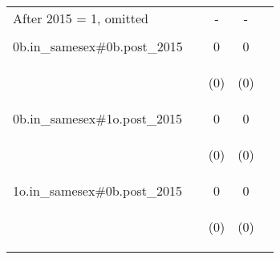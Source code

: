 \documentclass[]{article}
\begin{document}
\begin{center}
\begin{tabular}{lcccc}
After 2015 = 1, omitted &  & - & - &  \\
\vspace{4pt} & \begin{footnotesize}\end{footnotesize} & \begin{footnotesize}\end{footnotesize} & \begin{footnotesize}\end{footnotesize} & \begin{footnotesize}\end{footnotesize} \\
0b.in\_samesex\#0b.post\_2015 &  & 0 & 0 &  \\
\vspace{4pt} & \begin{footnotesize}\end{footnotesize} & \begin{footnotesize}(0)\end{footnotesize} & \begin{footnotesize}(0)\end{footnotesize} & \begin{footnotesize}\end{footnotesize} \\
0b.in\_samesex\#1o.post\_2015 &  & 0 & 0 &  \\
\vspace{4pt} & \begin{footnotesize}\end{footnotesize} & \begin{footnotesize}(0)\end{footnotesize} & \begin{footnotesize}(0)\end{footnotesize} & \begin{footnotesize}\end{footnotesize} \\
1o.in\_samesex\#0b.post\_2015 &  & 0 & 0 &  \\
\vspace{4pt} & \begin{footnotesize}\end{footnotesize} & \begin{footnotesize}(0)\end{footnotesize} & \begin{footnotesize}(0)\end{footnotesize} & \begin{footnotesize}\end{footnotesize} \\

\end{tabular}
\end{center}
\end{document}
